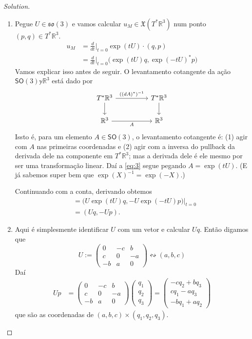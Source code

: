 \begin{proof}[Solution]\leavevmode
\begin{enumerate}[label=\alph*.]
\item Pegue $U\in\mathfrak{so}(3)$ e vamos calcular $u_M\in\mathfrak{X}(T^*\mathbb{R}^{3})$ num ponto $(p,q)\in T^*\mathbb{R}^{3}$.
	\begin{equation}\label{eq:3}
	\begin{aligned}
		u_M&=\frac{d}{dt}\Big|_{t=0}\operatorname{exp}(tU) \cdot(q,p)\\
		&=\frac{d}{dt}\Big|_{t=0}\Big(\operatorname{exp}(tU)q,\operatorname{exp}(-tU)^*p\Big)
	\end{aligned}
	\end{equation}
	Vamos explicar isso antes de seguir. O levantamento cotangente da ação $\mathsf{SO}(3)\mathbb{y}\mathbb{R}^3$ está dado por
	\[\begin{tikzcd}[column sep=huge]
		T^*\mathbb{R}^3\arrow[r,"((dA)^{*})^{-1}"]\arrow[d]&T^*\mathbb{R}^3\arrow[d]\\
		\mathbb{R}^3\arrow[r,swap,"A"]&\mathbb{R}^3
	\end{tikzcd}\]
	Issto é, para um elemento $A\in\mathsf{SO}(3)$, o levantamento cotangente é: (1) agir com $A$ nas primeiras coordenadas e (2) agir com a inversa do pullback da derivada dele na componente em $T^*\mathbb{R}^3$; mas  a derivada dele é ele mesmo por ser uma transformação linear. Daí a \cref{eq:3} segue pegando $A=\operatorname{exp}(tU)$. (E já sabemos super bem que $\operatorname{exp}(X)^{-1}=\operatorname{exp}(-X)$.)

	Continuando com a conta, derivando obtemos
	\begin{align*}
	&=\Big(U\operatorname{exp}(tU)q,-U\operatorname{exp}(-tU)p\Big)\Big|_{t=0}\\
	&=(Uq,-Up).
	\end{align*}
\item Aqui é simplesmente identificar $U$ com um vetor e calcular $Uq$. Então digamos que
	 \[U:=\begin{pmatrix}0&-c&b\\ c&0&-a\\ -b&a&0\end{pmatrix}\leftrightsquigarrow(a,b,c)\]
Daí
\begin{align*}
Up&=\begin{pmatrix}0&-c&b\\ c&0&-a\\ -b&a&0\end{pmatrix}\begin{pmatrix} q_1\\q_2\\q_3 \end{pmatrix} =\begin{pmatrix} -cq_2+bq_3\\cq_1-aq_3\\-bq_1+aq_2 \end{pmatrix} 
\end{align*}
que são as coordenadas de $(a,b,c)\times (q_1,q_2,q_3)$.


\end{enumerate}
\end{proof}
